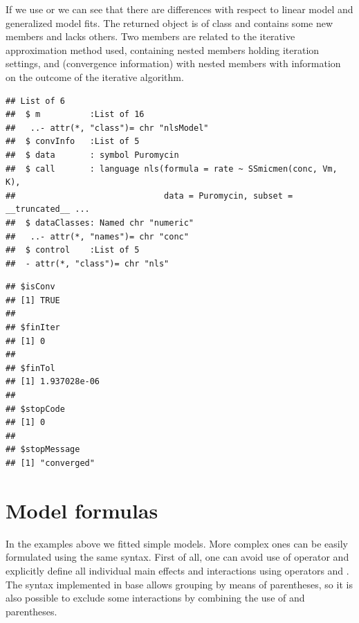 \documentclass[krantz2]{krantz}\usepackage{knitr}
\begin{document}
\begin{explainbox}
If we use  or  we can see that there are differences with respect to linear model and generalized model fits. The returned object is of class  and contains some new members and lacks others. Two members are related to the iterative approximation method used,  containing nested members holding iteration settings, and  (convergence information) with nested members with information on the outcome of the iterative algorithm.

\begin{knitrout}\footnotesize
{}\color{fgcolor}\begin{kframe}
\begin{alltt}
  \hlstd{=} \hlstd{)}
\end{alltt}
\begin{verbatim}
## List of 6
##  $ m          :List of 16
##   ..- attr(*, "class")= chr "nlsModel"
##  $ convInfo   :List of 5
##  $ data       : symbol Puromycin
##  $ call       : language nls(formula = rate ~ SSmicmen(conc, Vm, K), 
##                              data = Puromycin, subset = __truncated__ ...
##  $ dataClasses: Named chr "numeric"
##   ..- attr(*, "names")= chr "conc"
##  $ control    :List of 5
##  - attr(*, "class")= chr "nls"
\end{verbatim}
\end{kframe}
\end{knitrout}

\begin{knitrout}\footnotesize
{}\color{fgcolor}\begin{kframe}
\begin{alltt}
\hlopt{$}
\end{alltt}
\begin{verbatim}
## $isConv
## [1] TRUE
##
## $finIter
## [1] 0
##
## $finTol
## [1] 1.937028e-06
##
## $stopCode
## [1] 0
##
## $stopMessage
## [1] "converged"
\end{verbatim}
\end{kframe}
\end{knitrout}
\end{explainbox}


\section{Model formulas}
In the examples above we fitted simple models. More complex ones can be easily formulated using the same syntax. First of all, one can avoid use of operator \code{*} and explicitly define all individual main effects and interactions using operators \code{+} and \code{:}. The syntax implemented in base \Rlang allows grouping by means of parentheses, so it is also possible to exclude some interactions by combining the use of \code{*} and parentheses.
\end{document}
